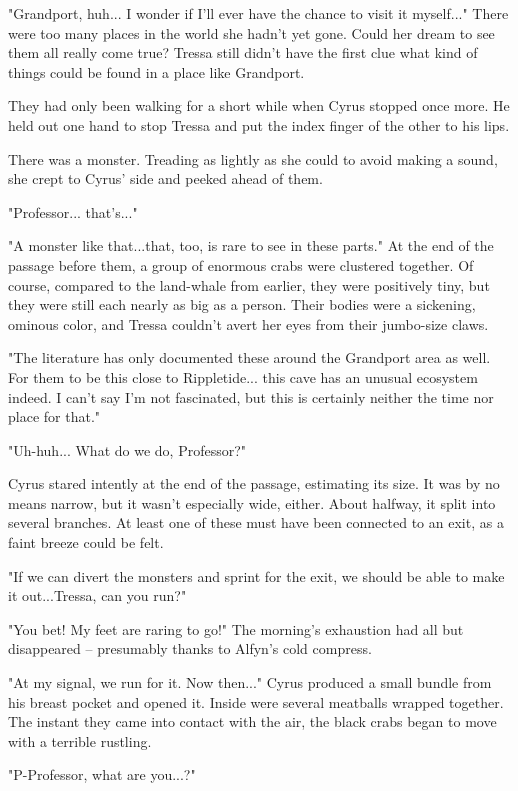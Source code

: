 "Grandport, huh... I wonder if I'll ever have the chance to visit it myself..." There were too many places in the world she hadn't yet gone. Could her dream to see them all really come true? Tressa still didn't have the first clue what kind of things could be found in a place like Grandport.

They had only been walking for a short while when Cyrus stopped once more. He held out one hand to stop Tressa and put the index finger of the other to his lips.

There was a monster. Treading as lightly as she could to avoid making a sound, she crept to Cyrus' side and peeked ahead of them.

"Professor... that's..."

"A monster like that...that, too, is rare to see in these parts." At the end of the passage before them, a group of enormous crabs were clustered together. Of course, compared to the land-whale from earlier, they were positively tiny, but they were still each nearly as big as a person. Their bodies were a sickening, ominous color, and Tressa couldn't avert her eyes from their jumbo-size claws.

"The literature has only documented these around the Grandport area as well. For them to be this close to Rippletide... this cave has an unusual ecosystem indeed. I can't say I'm not fascinated, but this is certainly neither the time nor place for that."

"Uh-huh... What do we do, Professor?"

Cyrus stared intently at the end of the passage, estimating its size. It was by no means narrow, but it wasn't especially wide, either. About halfway, it split into several branches. At least one of these must have been connected to an exit, as a faint breeze could be felt.

"If we can divert the monsters and sprint for the exit, we should be able to make it out...Tressa, can you run?"

"You bet! My feet are raring to go!" The morning's exhaustion had all but disappeared -- presumably thanks to Alfyn's cold compress.

"At my signal, we run for it. Now then..." Cyrus produced a small bundle from his breast pocket and opened it. Inside were several meatballs wrapped together. The instant they came into contact with the air, the black crabs began to move with a terrible rustling.

"P-Professor, what are you...?"

